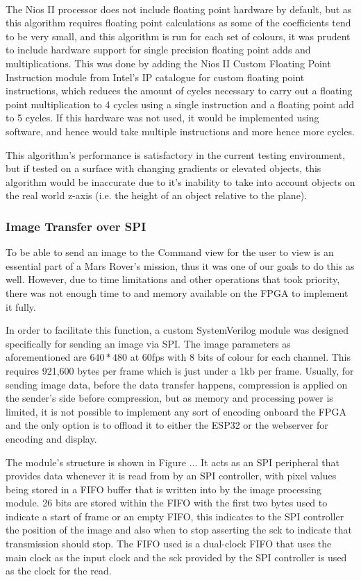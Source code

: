 \documentclass[a4paper]{article}
\begin{document}
The Nios\textsuperscript{\textregistered} II processor does not include floating point hardware by default, but as 
this algorithm requires floating point calculations as some of the coefficients 
tend to be very small, and this algorithm is run for each set of colours, it was
prudent to include hardware support for single precision floating point adds 
and multiplications. This was done by adding the Nios II Custom Floating Point Instruction module from Intel's IP catalogue 
for custom floating point instructions, which reduces the amount of cycles 
necessary to carry out a floating point multiplication to 4 cycles using a single
instruction and a floating point add to 5 cycles\cite{NiosIICustomInstruction}.
If this hardware was not used, it would be implemented using software, and hence
would take multiple instructions and more hence more cycles. 

This algorithm's performance is satisfactory in the current testing environment, 
but if tested on a surface with changing gradients or elevated objects, this algorithm
would be inaccurate due to it's inability to take into account objects on the real
world z-axis (i.e. the height of an object relative to the plane).

\subsubsection{Image Transfer over SPI}

To be able to send an image to the Command view for the user to view is an essential
part of a Mars Rover's mission, thus it was one of our goals to do this as well. However,
due to time limitations and other operations that took priority, there was not enough time
 to and memory available on the FPGA to implement it fully. 

In order to facilitate this function, a custom SystemVerilog module was designed specifically 
for sending an image via SPI. The image parameters as aforementioned are \(640 *480\) at 60fps 
with 8 bits of colour for each channel. This requires 921,600 bytes per frame which is just 
under a 1kb per frame. Usually, for sending image data, before the data transfer happens, 
compression is applied on the sender's side before compression, but as memory and processing
power is limited, it is not possible to implement any sort of encoding onboard the FPGA and the
only option is to offload it to either the ESP32 or the webserver for encoding and display. 

The module's structure is shown in Figure ... It acts as an SPI peripheral that provides 
data whenever it is read from by an SPI controller, with pixel values being stored in a FIFO 
buffer that is written into by the image processing module. 26 bits are stored within the FIFO
with the first two bytes used to indicate a start of frame or an empty FIFO, this indicates to the 
SPI controller the position of the image and also when to stop asserting the sck to indicate that 
transmission should stop. The FIFO used is a dual-clock FIFO that uses the main clock as the input
clock and the sck provided by the SPI controller is used as the clock for the read.  
\end{document}
